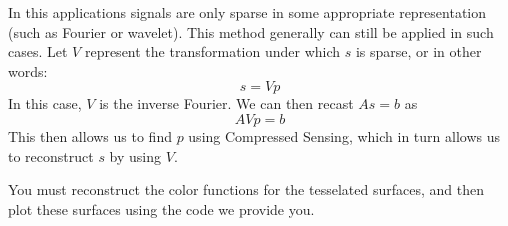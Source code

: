 
In this applications signals are only sparse in some appropriate representation (such as Fourier or wavelet).
This method generally can still be applied in such cases.
Let $V$ represent the transformation under which $s$ is sparse, or in other words:
\[s = V p\]
In this case, $V$ is the inverse Fourier. We can then recast $A s=b$ as
\begin{equation}
A V p = b
\end{equation}
This then allows us to find $p$ using Compressed Sensing, which in turn allows us to reconstruct $s$ by using $V$.

You must reconstruct the color functions for the tesselated surfaces, and then plot these surfaces using the code we provide you.

